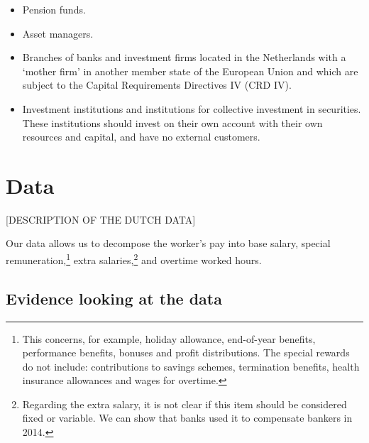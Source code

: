 \documentclass[12pt]{article}
\begin{document}
\begin{itemize}
	\begin{itemize}
		\item Pension funds.
		\item Asset managers.
		\item  Branches of banks and investment
		firms located in the Netherlands with a
		‘mother firm’ in another member state
		of the European Union and which are
		subject to the Capital Requirements
		Directives IV (CRD IV).
		\item Investment institutions and institutions
		for collective investment in securities.
		These institutions should invest on their
		own account with their own resources
		and capital, and have no external
		customers.
	\end{itemize}
	
\end{itemize}



\section{Data} \label{data}


[DESCRIPTION OF THE DUTCH DATA]

Our data allows us to decompose the worker's pay into base salary, special remuneration,\footnote{This concerns, for example, holiday allowance, end-of-year benefits, performance benefits, bonuses and profit distributions. The special rewards do not include: contributions to savings schemes, termination benefits, health insurance allowances and wages for overtime.} extra salaries,\footnote{Regarding the extra salary, it is not clear if this item should be considered fixed or variable. We can show that banks used it to compensate bankers in 2014.} and overtime worked hours. \\


\subsection{Evidence looking at the data}
	
\end{document}
